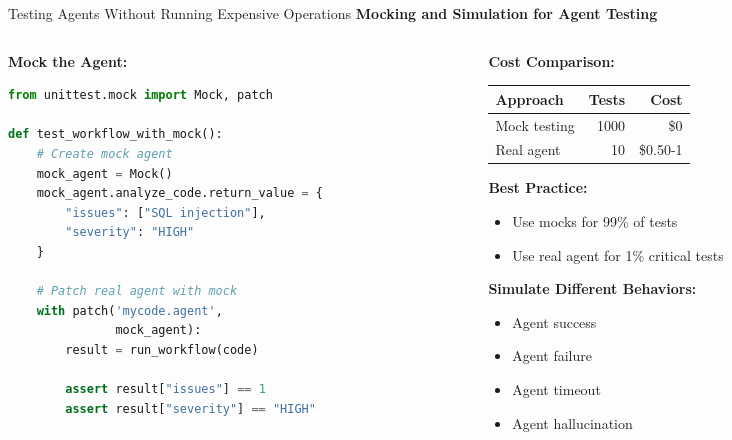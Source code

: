 \documentclass[aspectratio=169,11pt]{beamer}
\begin{document}
\begin{frame}[fragile]{Testing Agents Without Running Expensive Operations}
    \textbf{Mocking and Simulation for Agent Testing}

    \begin{columns}[T]
        \begin{column}{0.48\textwidth}
            \textbf{Mock the Agent:}
            \begin{lstlisting}[language=Python]
from unittest.mock import Mock, patch

def test_workflow_with_mock():
    # Create mock agent
    mock_agent = Mock()
    mock_agent.analyze_code.return_value = {
        "issues": ["SQL injection"],
        "severity": "HIGH"
    }

    # Patch real agent with mock
    with patch('mycode.agent',
               mock_agent):
        result = run_workflow(code)

        assert result["issues"] == 1
        assert result["severity"] == "HIGH"
            \end{lstlisting}
        \end{column}
        \begin{column}{0.48\textwidth}
            \textbf{Cost Comparison:}

            \begin{tabular}{lrr}
                \toprule
                Approach & Tests & Cost\\
                \midrule
                Mock testing & 1000 & \$0\\
                Real agent & 10 & \$0.50-1\\
                \bottomrule
            \end{tabular}

            \vspace{0.3cm}
            \textbf{Best Practice:}
            \begin{itemize}
                \item Use mocks for 99\% of tests
                \item Use real agent for 1\% critical tests
            \end{itemize}

            \textbf{Simulate Different Behaviors:}
            \begin{itemize}
                \item Agent success
                \item Agent failure
                \item Agent timeout
                \item Agent hallucination
            \end{itemize}
        \end{column}
    \end{columns}
\end{frame}
\end{document}
